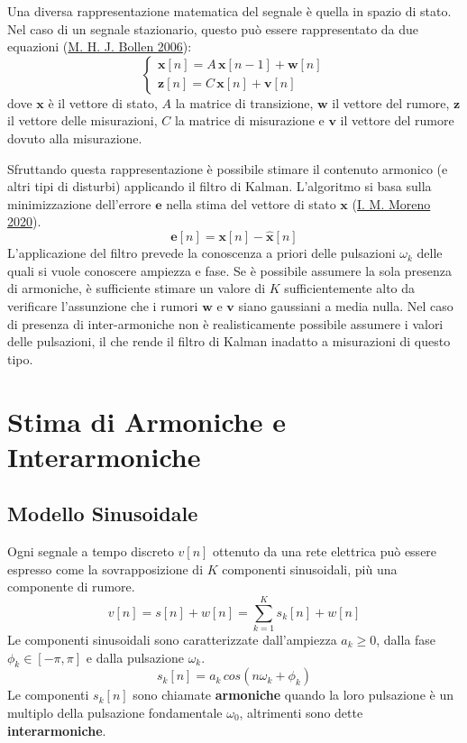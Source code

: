 \documentclass[
  italian,
]{article}
\begin{document}
Una diversa rappresentazione matematica del segnale è quella in spazio
di stato. Nel caso di un segnale stazionario, questo può essere
rappresentato da due equazioni (\protect\hyperlink{ref-dsp-pqd}{M. H. J.
Bollen 2006}): \[
\begin{cases}
\mathbf{x}[n] = A \, \mathbf{x}[n-1] + \mathbf{w}[n] \\
\mathbf{z}[n] = C \, \mathbf{x}[n] + \mathbf{v}[n]
\end{cases}
\] dove \(\mathbf{x}\) è il vettore di stato, \(A\) la matrice di
transizione, \(\mathbf{w}\) il vettore del rumore, \(\mathbf{z}\) il
vettore delle misurazioni, \(C\) la matrice di misurazione e
\(\mathbf{v}\) il vettore del rumore dovuto alla misurazione.

Sfruttando questa rappresentazione è possibile stimare il contenuto
armonico (e altri tipi di disturbi) applicando il filtro di Kalman.
L'algoritmo si basa sulla minimizzazione dell'errore \(\mathbf{e}\)
nella stima del vettore di stato \(\mathbf{x}\)
(\protect\hyperlink{ref-state-est-kalman}{I. M. Moreno 2020}). \[
\mathbf{e}[n] = \mathbf{x}[n] - \hat{\mathbf{x}}[n]
\] L'applicazione del filtro prevede la conoscenza a priori delle
pulsazioni \(\omega_k\) delle quali si vuole conoscere ampiezza e fase.
Se è possibile assumere la sola presenza di armoniche, è sufficiente
stimare un valore di \(K\) sufficientemente alto da verificare
l'assunzione che i rumori \(\mathbf{w}\) e \(\mathbf{v}\) siano
gaussiani a media nulla. Nel caso di presenza di inter-armoniche non è
realisticamente possibile assumere i valori delle pulsazioni, il che
rende il filtro di Kalman inadatto a misurazioni di questo tipo.

\hypertarget{stima-di-armoniche-e-interarmoniche}{%
\section{Stima di Armoniche e
Interarmoniche}\label{stima-di-armoniche-e-interarmoniche}}

\hypertarget{modello-sinusoidale}{%
\subsection{Modello Sinusoidale}\label{modello-sinusoidale}}

Ogni segnale a tempo discreto \(v[n]\) ottenuto da una rete elettrica
può essere espresso come la sovrapposizione di \(K\) componenti
sinusoidali, più una componente di rumore. \[
v[n] = s[n] + w[n] = \sum_{k=1}^K s_k[n] + w[n]
\] Le componenti sinusoidali sono caratterizzate dall'ampiezza
\(a_k \geq 0\), dalla fase \(\phi_k \in [-\pi, \pi]\) e dalla pulsazione
\(\omega_k\). \[
s_k[n] = a_k \, cos \left( n \omega_k + \phi_k \right)
\] Le componenti \(s_k[n]\) sono chiamate \textbf{armoniche} quando la
loro pulsazione è un multiplo della pulsazione fondamentale
\(\omega_0\), altrimenti sono dette \textbf{interarmoniche}.
\end{document}

